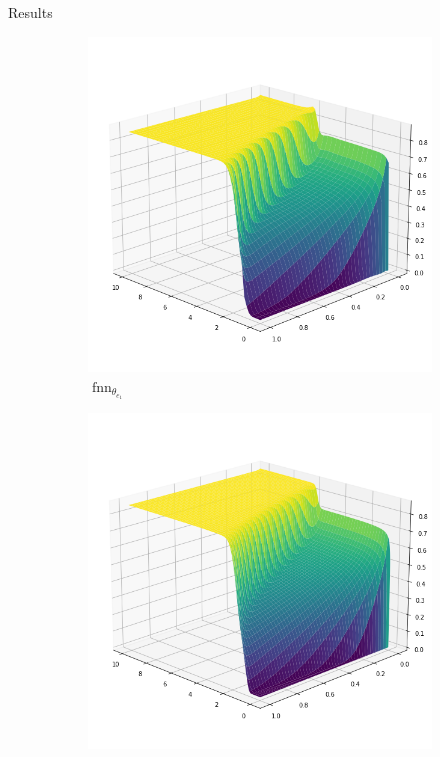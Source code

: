 \documentclass[9pt]{beamer}
\begin{document}
\begin{frame}{Results}
    \begin{figure}[H]
        \begin{center}
            \begin{subfigure}[b]{0.4\textwidth}
                \begin{center}
                    \includegraphics[scale=0.25]{img/Kante1.png}
                \end{center}
                \caption{$\operatorname{fnn}_{\theta_{e_1}}$}
            \end{subfigure} \hspace{10mm}
            \begin{subfigure}[b]{0.4\textwidth}
                \begin{center}
                    \includegraphics[scale=0.25]{img/FVM1.png}

\end{center}
\end{subfigure}
\end{center}
\end{figure}
\end{frame}
\end{document}
